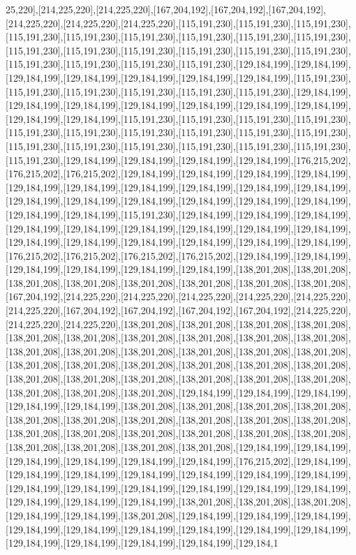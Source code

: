 25,220],[214,225,220],[214,225,220],[167,204,192],[167,204,192],[167,204,192],[214,225,220],[214,225,220],[214,225,220],[115,191,230],[115,191,230],[115,191,230],[115,191,230],[115,191,230],[115,191,230],[115,191,230],[115,191,230],[115,191,230],[115,191,230],[115,191,230],[115,191,230],[115,191,230],[115,191,230],[115,191,230],[115,191,230],[115,191,230],[115,191,230],[115,191,230],[129,184,199],[129,184,199],[129,184,199],[129,184,199],[129,184,199],[129,184,199],[129,184,199],[115,191,230],[115,191,230],[115,191,230],[115,191,230],[115,191,230],[115,191,230],[129,184,199],[129,184,199],[129,184,199],[129,184,199],[129,184,199],[129,184,199],[129,184,199],[129,184,199],[129,184,199],[115,191,230],[115,191,230],[115,191,230],[115,191,230],[115,191,230],[115,191,230],[115,191,230],[115,191,230],[115,191,230],[115,191,230],[115,191,230],[115,191,230],[115,191,230],[115,191,230],[115,191,230],[115,191,230],[115,191,230],[129,184,199],[129,184,199],[129,184,199],[129,184,199],[176,215,202],[176,215,202],[176,215,202],[129,184,199],[129,184,199],[129,184,199],[129,184,199],[129,184,199],[129,184,199],[129,184,199],[129,184,199],[129,184,199],[129,184,199],[129,184,199],[129,184,199],[129,184,199],[129,184,199],[129,184,199],[129,184,199],[129,184,199],[129,184,199],[115,191,230],[129,184,199],[129,184,199],[129,184,199],[129,184,199],[129,184,199],[129,184,199],[129,184,199],[129,184,199],[129,184,199],[129,184,199],[129,184,199],[129,184,199],[129,184,199],[129,184,199],[129,184,199],[176,215,202],[176,215,202],[176,215,202],[176,215,202],[129,184,199],[129,184,199],[129,184,199],[129,184,199],[129,184,199],[129,184,199],[138,201,208],[138,201,208],[138,201,208],[138,201,208],[138,201,208],[138,201,208],[138,201,208],[138,201,208],[167,204,192],[214,225,220],[214,225,220],[214,225,220],[214,225,220],[214,225,220],[214,225,220],[167,204,192],[167,204,192],[167,204,192],[167,204,192],[214,225,220],[214,225,220],[214,225,220],[138,201,208],[138,201,208],[138,201,208],[138,201,208],[138,201,208],[138,201,208],[138,201,208],[138,201,208],[138,201,208],[138,201,208],[138,201,208],[138,201,208],[138,201,208],[138,201,208],[138,201,208],[138,201,208],[138,201,208],[138,201,208],[138,201,208],[138,201,208],[138,201,208],[138,201,208],[138,201,208],[138,201,208],[138,201,208],[138,201,208],[138,201,208],[138,201,208],[138,201,208],[138,201,208],[138,201,208],[129,184,199],[129,184,199],[129,184,199],[129,184,199],[129,184,199],[138,201,208],[138,201,208],[138,201,208],[138,201,208],[138,201,208],[138,201,208],[138,201,208],[138,201,208],[138,201,208],[138,201,208],[138,201,208],[138,201,208],[138,201,208],[138,201,208],[138,201,208],[138,201,208],[138,201,208],[138,201,208],[138,201,208],[138,201,208],[129,184,199],[129,184,199],[129,184,199],[129,184,199],[129,184,199],[129,184,199],[176,215,202],[129,184,199],[129,184,199],[129,184,199],[129,184,199],[129,184,199],[129,184,199],[129,184,199],[129,184,199],[129,184,199],[129,184,199],[129,184,199],[129,184,199],[129,184,199],[129,184,199],[129,184,199],[129,184,199],[138,201,208],[138,201,208],[138,201,208],[129,184,199],[129,184,199],[138,201,208],[129,184,199],[129,184,199],[129,184,199],[129,184,199],[129,184,199],[129,184,199],[129,184,199],[129,184,199],[129,184,199],[129,184,199],[129,184,199],[129,184,199],[129,184,199],[129,184,1